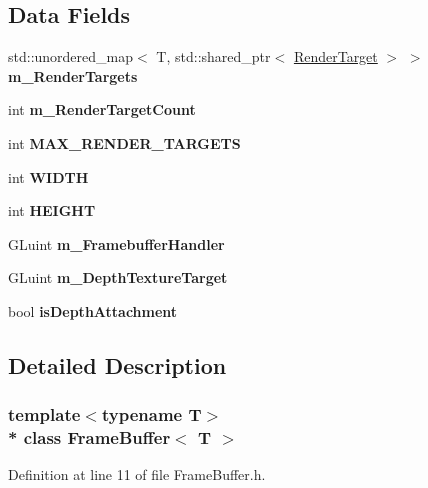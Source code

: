 \subsection*{Data Fields}
\begin{DoxyCompactItemize}
\item 
std\+::unordered\+\_\+map$<$ T, std\+::shared\+\_\+ptr$<$ \hyperlink{class_render_target}{Render\+Target} $>$ $>$ {\bfseries m\+\_\+\+Render\+Targets}\hypertarget{class_frame_buffer_a7c5cdda0f659fba287d1a5b3d09de387}{}\label{class_frame_buffer_a7c5cdda0f659fba287d1a5b3d09de387}

\item 
int {\bfseries m\+\_\+\+Render\+Target\+Count}\hypertarget{class_frame_buffer_a01b5ec507b23c7b821675308391fc9df}{}\label{class_frame_buffer_a01b5ec507b23c7b821675308391fc9df}

\item 
int {\bfseries M\+A\+X\+\_\+\+R\+E\+N\+D\+E\+R\+\_\+\+T\+A\+R\+G\+E\+TS}\hypertarget{class_frame_buffer_a5b334773e9a54ade675e1b538706eae8}{}\label{class_frame_buffer_a5b334773e9a54ade675e1b538706eae8}

\item 
int {\bfseries W\+I\+D\+TH}\hypertarget{class_frame_buffer_a11fe0a9c9c4f35abd66a2c77e1c740f9}{}\label{class_frame_buffer_a11fe0a9c9c4f35abd66a2c77e1c740f9}

\item 
int {\bfseries H\+E\+I\+G\+HT}\hypertarget{class_frame_buffer_ab85b82233910477a28c1ca8f69dbe555}{}\label{class_frame_buffer_ab85b82233910477a28c1ca8f69dbe555}

\item 
G\+Luint {\bfseries m\+\_\+\+Framebuffer\+Handler}\hypertarget{class_frame_buffer_a16bcb5f0c8a1064dd075b89965b79863}{}\label{class_frame_buffer_a16bcb5f0c8a1064dd075b89965b79863}

\item 
G\+Luint {\bfseries m\+\_\+\+Depth\+Texture\+Target}\hypertarget{class_frame_buffer_a49198d665734401aa6b28860fc9442e8}{}\label{class_frame_buffer_a49198d665734401aa6b28860fc9442e8}

\item 
bool {\bfseries is\+Depth\+Attachment}\hypertarget{class_frame_buffer_a065cf8faab04276cb7e6a4cd004512d1}{}\label{class_frame_buffer_a065cf8faab04276cb7e6a4cd004512d1}

\end{DoxyCompactItemize}


\subsection{Detailed Description}
\subsubsection*{template$<$typename T$>$\\*
class Frame\+Buffer$<$ T $>$}



Definition at line 11 of file Frame\+Buffer.\+h.

